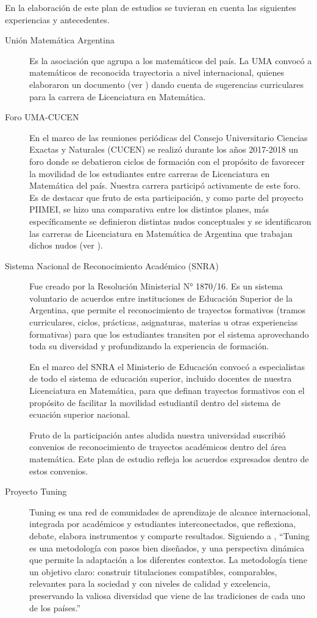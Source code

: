 \documentclass[a4paper, 12pt]{article}
\begin{document}
En la elaboración de este plan de estudios se tuvieran en cuenta las siguientes experiencias y antecedentes.
\begin{description}
 \item[Unión Matemática Argentina]  Es la asociación que agrupa a los matemáticos del país.  La UMA convocó a matemáticos de reconocida trayectoria a nivel internacional, quienes elaboraron un documento (ver \cite{uma}) 
 dando cuenta de sugerencias curriculares para la carrera de Licenciatura en Matemática.
 
 \item[Foro UMA-CUCEN] En el marco de las reuniones periódicas del Consejo Universitario Ciencias Exactas y Naturales (CUCEN) se realizó durante los años 2017-2018 un foro donde se debatieron ciclos de formación con el propósito de favorecer la movilidad de los estudiantes entre carreras de Licenciatura en Matemática del país. Nuestra carrera participó activamente de este foro. Es de destacar que fruto de esta participación, y como parte del proyecto PIIMEI, se hizo una comparativa entre los distintos planes, más específicamente se definieron distintas nudos conceptuales y se identificaron las carreras de Licenciatura en Matemática de Argentina que trabajan dichos nudos (ver \cite{CCP}). 

\item[Sistema Nacional de Reconocimiento Académico (SNRA)] Fue creado por la Resolución Ministerial N° 1870/16. Es un sistema voluntario de acuerdos entre instituciones de Educación Superior de la Argentina, que permite el reconocimiento de trayectos formativos (tramos curriculares, ciclos, prácticas, asignaturas, materias u otras experiencias formativas) para que los estudiantes transiten por el sistema aprovechando toda su diversidad y profundizando la experiencia de formación.

En el marco del SNRA el Ministerio de Educación convocó a especialistas de todo el sistema de educación superior, incluido docentes de nuestra Licenciatura en Matemática,  para que definan trayectos formativos con el propósito de facilitar la movilidad estudiantil dentro del sistema de ecuación superior nacional. 

Fruto de la participación antes aludida nuestra universidad suscribió convenios de reconocimiento de trayectos académicos dentro del área matemática. Este plan de estudio refleja los acuerdos expresados dentro de estos convenios.

\item[Proyecto Tuning] Tuning es una red de comunidades de aprendizaje de alcance internacional, integrada por académicos y estudiantes interconectados, que reflexiona, debate, elabora instrumentos
y comparte resultados. Siguiendo a \cite{paniagua2013educacion},
 ``Tuning es una metodología con pasos bien diseñados, y una perspectiva dinámica que permite la adaptación a los diferentes contextos. La metodología tiene un objetivo claro: construir titulaciones compatibles, comparables, relevantes para la sociedad y con niveles
de calidad y excelencia, preservando la valiosa diversidad que viene de las
tradiciones de cada uno de los países.'' 


\end{description}
\end{document}
